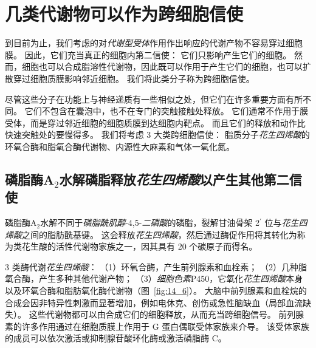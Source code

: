 \section{几类代谢物可以作为跨细胞信使}

到目前为止，我们考虑的对\textit{代谢型受体}作用作出响应的代谢产物不容易穿过细胞膜。
因此，它们充当真正的细胞内第二信使：
它们只影响产生它们的细胞。
然而，细胞也可以合成脂溶性代谢物，因此既可以作用于产生它们的细胞，也可以扩散穿过细胞质膜影响邻近细胞。
我们将此类分子称为跨细胞信使。


尽管这些分子在功能上与神经递质有一些相似之处，但它们在许多重要方面有所不同。
它们不包含在囊泡中，也不在专门的突触接触处释放。
它们通常不作用于膜受体，而是穿过邻近细胞的细胞质膜到达细胞内靶点。
而且它们的释放和动作比快速突触处的要慢得多。
我们将考虑 3 大类跨细胞信使：
脂质分子\textit{花生四烯酸}的环氧合酶和脂氧合酶代谢物、内源性大麻素和气体一氧化氮。



\subsection{磷脂酶A$_2$水解磷脂释放\textit{花生四烯酸}以产生其他第二信使}

磷脂酶A$_2$水解不同于\textit{磷脂酰肌醇}-4,5-\textit{二磷酸}的磷脂，裂解甘油骨架 2$^{\prime}$ 位与\textit{花生四烯酸}之间的脂肪酰基键。
这会释放\textit{花生四烯酸}，然后通过酶促作用将其转化为称为类花生酸的活性代谢物家族之一，因其具有 20 个碳原子而得名。


3 类酶代谢\textit{花生四烯酸}：
（1）环氧合酶，产生前列腺素和血栓素；
（2）几种脂氧合酶，产生多种其他代谢产物；
（3）\textit{细胞色素}P450，它氧化\textit{花生四烯酸}本身以及环氧合酶和脂肪氧化酶代谢物（图~\ref{fig:14_6}）。
大脑中前列腺素和血栓烷的合成会因非特异性刺激而显著增加，例如电休克、创伤或急性脑缺血（局部血流缺失）。
这些代谢物都可以由合成它们的细胞释放，从而充当跨细胞信号。
前列腺素的许多作用通过在细胞质膜上作用于 G 蛋白偶联受体家族来介导。
该受体家族的成员可以依次激活或抑制腺苷酸环化酶或激活磷脂酶 C。


